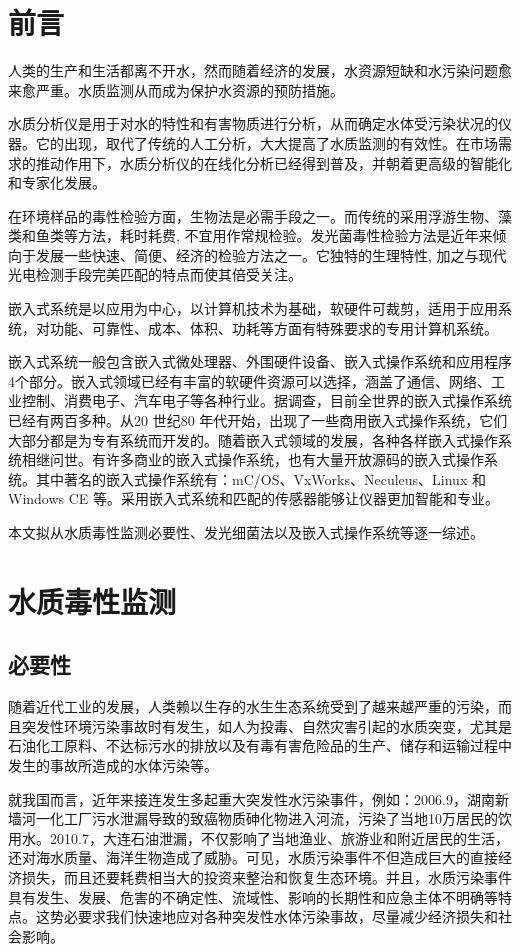 \section{前言}

	人类的生产和生活都离不开水，然而随着经济的发展，水资源短缺和水污染问题愈来愈严重。水质监测从而成为保护水资源的预防措施。 

	水质分析仪是用于对水的特性和有害物质进行分析，从而确定水体受污染状况的仪器。它的出现，取代了传统的人工分析，大大提高了水质监测的有效性。在市场需求的推动作用下，水质分析仪的在线化分析已经得到普及，并朝着更高级的智能化和专家化发展。\cite{zaixian}

	在环境样品的毒性检验方面，生物法是必需手段之一。而传统的采用浮游生物、藻类和鱼类等方法，耗时耗费, 不宜用作常规检验。发光菌毒性检验方法是近年来倾向于发展一些快速、简便、经济的检验方法之一。它独特的生理特性, 加之与现代光电检测手段完美匹配的特点而使其倍受关注。

    嵌入式系统是以应用为中心，以计算机技术为基础，软硬件可裁剪，适用于应用系统，对功能、可靠性、成本、体积、功耗等方面有特殊要求的专用计算机系统。\cite{qianrushi}
    
	嵌入式系统一般包含嵌入式微处理器、外围硬件设备、嵌入式操作系统和应用程序4个部分。嵌入式领域已经有丰富的软硬件资源可以选择，涵盖了通信、网络、工业控制、消费电子、汽车电子等各种行业。据调查，目前全世界的嵌入式操作系统已经有两百多种。从20 世纪80 年代开始，出现了一些商用嵌入式操作系统，它们大部分都是为专有系统而开发的。随着嵌入式领域的发展，各种各样嵌入式操作系统相继问世。有许多商业的嵌入式操作系统，也有大量开放源码的嵌入式操作系统。其中著名的嵌入式操作系统有：mC/OS、VxWorks、Neculeus、Linux 和Windows
CE 等。采用嵌入式系统和匹配的传感器能够让仪器更加智能和专业。

    本文拟从水质毒性监测必要性、发光细菌法以及嵌入式操作系统等逐一综述。
\section{水质毒性监测}
\subsection{必要性}
	随着近代工业的发展，人类赖以生存的水生生态系统受到了越来越严重的污染，而且突发性环境污染事故时有发生，如人为投毒、自然灾害引起的水质突变，尤其是石油化工原料、不达标污水的排放以及有毒有害危险品的生产、储存和运输过程中发生的事故所造成的水体污染等。
	
	就我国而言，近年来接连发生多起重大突发性水污染事件，例如：2006.9，湖南新墙河一化工厂污水泄漏导致的致癌物质砷化物进入河流，污染了当地10万居民的饮用水。2010.7，大连石油泄漏，不仅影响了当地渔业、旅游业和附近居民的生活，还对海水质量、海洋生物造成了威胁。可见，水质污染事件不但造成巨大的直接经济损失，而且还要耗费相当大的投资来整治和恢复生态环境。并且，水质污染事件具有发生、发展、危害的不确定性、流域性、影响的长期性和应急主体不明确等特点。这势必要求我们快速地应对各种突发性水体污染事故，尽量减少经济损失和社会影响。
	
